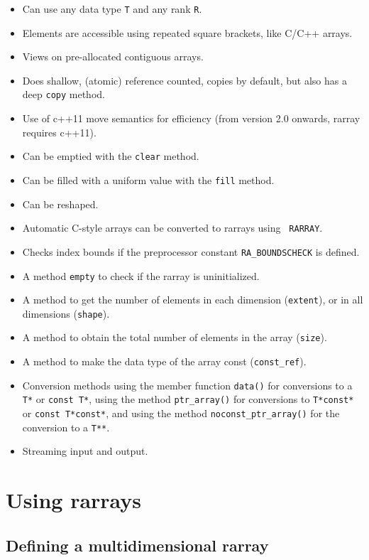\documentclass[11pt,twoside]{article}
\begin{document}
\begin{itemize}\itemsep0pt\parskip2pt
\item Can use any data type {\tt T} and any rank {\tt R}.
\item Elements are accessible using repeated square brackets, like C/C++ arrays.
\item Views on pre-allocated contiguous arrays.
\item Does shallow, (atomic) reference counted, copies by default, but also has a deep {\tt copy}
  method.
\item Use of c++11 move semantics for efficiency (from version 2.0
  onwards, rarray requires c++11).
\item Can be emptied with the {\tt clear} method.
\item Can be filled with a uniform value with the {\tt fill} method.
\item Can be reshaped.
\item Automatic C-style arrays can be converted to rarrays using {\tt
  RARRAY}.
\item Checks index bounds if the preprocessor constant {\tt RA\_BOUNDSCHECK} is defined. 
\item A method {\tt empty} to check if the rarray is uninitialized.
\item A method to get the number of elements in each
  dimension (\texttt{extent}), or in all dimensions (\texttt{shape}).
\item A method to obtain the total number of elements in the
  array (\texttt{size}).
\item A method to make the data type of the array const
  (\texttt{const\_ref}).
\item Conversion methods using the member
  function \texttt{data()} for conversions to a \texttt{T*} or
  \texttt{const T*}, using the method \texttt{ptr\_array()} for
  conversions to \texttt{T*const*} or \texttt{const T*const*}, and
  using the method \texttt{noconst\_ptr\_array()} for the conversion to a
  \texttt{T**}.
\item Streaming input and output.
\end{itemize}

\section{Using rarrays}

\subsection{Defining a multidimensional rarray}
\label{definerarray}
\end{document}

